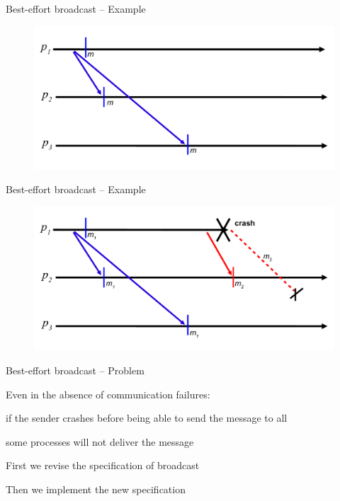 \begin{frame}{Best-effort broadcast -- Example}
	
\begin{figure}
\includegraphics[width=\textwidth]{figs/04/beb-normal}
\end{figure}

\end{frame}

\begin{frame}{Best-effort broadcast -- Example}
	
\begin{figure}
\includegraphics[width=\textwidth]{figs/04/beb-failure}
\end{figure}

\end{frame}

\begin{frame}{Best-effort broadcast -- Problem}
	

\BIL
\item Even in the absence of communication failures:
\BI
\item if the sender crashes before being able to send  the message to all
\item some processes will not deliver the message
\EI
\EIL

\bigskip
{}

\BIL
\item First we revise the specification of broadcast
\item Then we implement the new specification	
\EIL

\end{frame}

